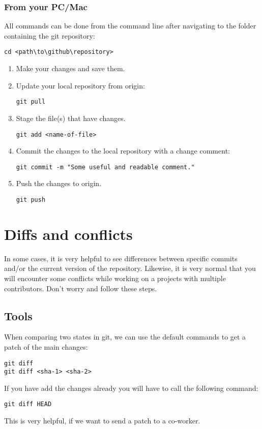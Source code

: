 \documentclass{article}
\begin{document}
\subsubsection{From your PC/Mac}
All commands can be done from the command line after navigating to the folder containing the git repository:
\begin{verbatim}
cd <path\to\github\repository>
\end{verbatim}

\begin{enumerate}
    \item Make your changes and save them.
    \item Update your local repository from origin:
	\begin{verbatim}
git pull   
    \end{verbatim}
	\item Stage the file(s) that have changes.
	\begin{verbatim}
git add <name-of-file>
    \end{verbatim}
	\item Commit the changes to the local repository with a change comment:
	\begin{verbatim}
git commit -m "Some useful and readable comment."
    \end{verbatim}
	\item Push the changes to origin.
	\begin{verbatim}
git push
    \end{verbatim}
\end{enumerate}

\section{Diffs and conflicts}
In some cases, it is very helpful to see differences between specific commits and/or the current version of the repository.
Likewise, it is very normal that you will encounter some conflicts while working on a projects with multiple contributors. Don't worry and follow these steps.

\subsection{Tools}
When comparing two states in git, we can use the default commands to get a patch of the main changes:
\begin{verbatim}
git diff
git diff <sha-1> <sha-2>
\end{verbatim}
If you have add the changes already you will have to call the following command:
\begin{verbatim}
git diff HEAD
\end{verbatim}
This is very helpful, if we want to send a patch to a co-worker.
\end{document}
